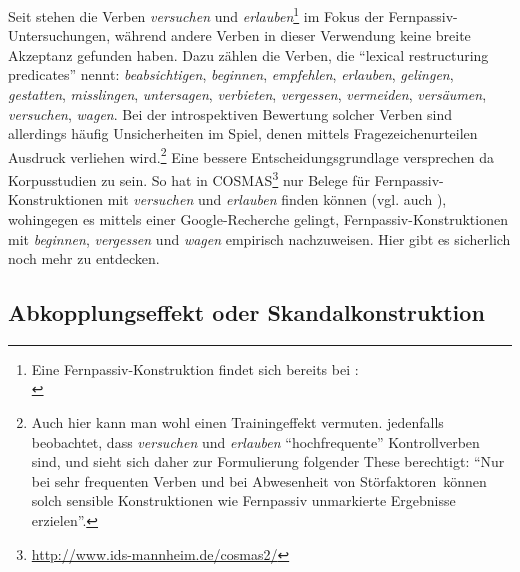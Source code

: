 Seit \cite{Hoehle:78} stehen die Verben {\it versuchen} und {\it erlauben}\footnote{Eine Fernpassiv-Konstruktion findet sich bereits bei \cite{Bech:55}:\\
} im Fokus der Fernpassiv-Untersuchungen, während andere Verben in dieser Verwendung keine breite Akzeptanz gefunden haben. Dazu zählen die Verben, die \citet[16]{Wurmbrand:01} "`lexical restructuring predicates"' nennt: {\it beabsichtigen}, {\it beginnen}, {\it empfehlen}, {\it erlauben}, {\it gelingen}, {\it gestatten}, {\it misslingen}, {\it untersagen}, {\it verbieten}, {\it vergessen}, {\it vermeiden}, {\it versäumen}, {\it versuchen}, {\it wagen}. Bei der introspektiven Bewertung solcher Verben sind allerdings häufig Unsicherheiten im Spiel, denen mittels Fragezeichenurteilen Ausdruck verliehen wird.\footnote{Auch hier kann man wohl einen Trainingeffekt vermuten. \citet[31]{Grosse:05} jedenfalls beobachtet, dass {\it versuchen} und {\it erlauben} "`hochfrequente"' Kontrollverben sind, und sieht sich daher zur Formulierung folgender These berechtigt: "`Nur bei sehr frequenten Verben und bei Abwesenheit von \glq Störfaktoren\grq\ können solch sensible Konstruktionen wie Fernpassiv unmarkierte Ergebnisse erzielen"'.} Eine bessere Entscheidungsgrundlage versprechen da Korpusstudien zu sein. So hat \citet[30f]{Grosse:05} in COSMAS\footnote{\url{http://www.ids-mannheim.de/cosmas2/}} nur Belege für Fernpassiv-Konstruktionen mit {\it versuchen} und {\it erlauben} finden können (vgl. auch \citealt[Abschnitt~3.1.4.1]{Mueller:02}), wohingegen es \cite{Wurmbrand:03} mittels einer Google-Recherche gelingt, Fernpassiv-Konstruktionen mit {\it beginnen}, {\it vergessen} und {\it wagen} empirisch nachzuweisen. Hier gibt es sicherlich noch mehr zu entdecken.  
 
\subsection{Abkopplungseffekt oder Skandalkonstruktion} \label{sec-skandal}
  
